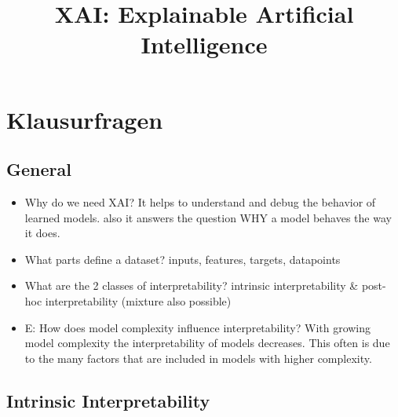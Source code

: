 \documentclass{report}
\title{XAI: Explainable Artificial Intelligence}
\begin{document}
	
	\maketitle
	\newpage
	
	\tableofcontents
	\newpage
	
	\chapter{Klausurfragen}
	
	\section{General}
	
	\begin{itemize}
		\item Why do we need XAI?
		\newline It helps to understand and debug the behavior of learned models. also it answers the question WHY a model behaves the way it does.
		\item What parts define a dataset?
		\newline inputs, features, targets, datapoints
		\item What are the 2 classes of interpretability?
		\newline intrinsic interpretability \& post-hoc interpretability (mixture also possible)
		\item E: How does model complexity influence interpretability?
		\newline With growing model complexity the interpretability of models decreases. This often is due to the many factors that are included in models with higher complexity.
	\end{itemize}

	\section{Intrinsic Interpretability}
	
\end{document}
